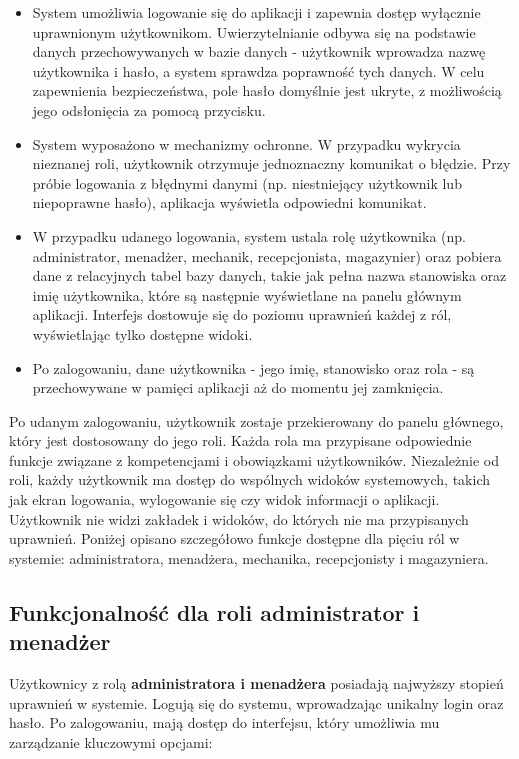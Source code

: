 \begin{itemize}
    \item System umożliwia logowanie się do aplikacji i zapewnia dostęp wyłącznie uprawnionym użytkownikom. Uwierzytelnianie odbywa się na podstawie danych przechowywanych w bazie danych - użytkownik wprowadza nazwę użytkownika i hasło, a system sprawdza poprawność tych danych. W celu zapewnienia bezpieczeństwa, pole hasło domyślnie jest ukryte, z możliwością jego odsłonięcia za pomocą przycisku.
    \item System wyposażono w mechanizmy ochronne. W przypadku wykrycia nieznanej roli, użytkownik otrzymuje jednoznaczny komunikat o błędzie. Przy próbie logowania z błędnymi danymi (np. niestniejący użytkownik lub niepoprawne hasło), aplikacja wyświetla odpowiedni komunikat.
    \item W przypadku udanego logowania, system ustala rolę użytkownika (np. administrator, menadżer, mechanik, recepcjonista, magazynier) oraz pobiera dane z relacyjnych tabel bazy danych, takie jak pełna nazwa stanowiska oraz imię użytkownika, które są następnie wyświetlane na panelu głównym aplikacji. Interfejs dostowuje się do poziomu uprawnień każdej z ról, wyświetlając tylko dostępne widoki.
    \item Po zalogowaniu, dane użytkownika - jego imię, stanowisko oraz rola - są przechowywane w pamięci aplikacji aż do momentu jej zamknięcia.
\end{itemize}
Po udanym zalogowaniu, użytkownik zostaje przekierowany do panelu głównego, który jest dostosowany do jego roli. Każda rola ma przypisane odpowiednie funkcje związane z kompetencjami i obowiązkami użytkowników. Niezależnie od roli, każdy użytkownik ma dostęp do wspólnych widoków systemowych, takich jak ekran logowania, wylogowanie się czy widok informacji o aplikacji. Użytkownik nie widzi zakładek i widoków, do których nie ma przypisanych uprawnień. Poniżej opisano szczegółowo funkcje dostępne dla pięciu ról w systemie: administratora, menadżera, mechanika, recepcjonisty i magazyniera.

\subsection{Funkcjonalność dla roli administrator i menadżer}
\label{sec:funkcjonalnoscAdministratora}
Użytkownicy z rolą \textbf{administratora i menadżera} posiadają najwyższy stopień uprawnień w systemie. Logują się do systemu, wprowadzając unikalny login oraz hasło. Po zalogowaniu, mają dostęp do interfejsu, który umożliwia mu zarządzanie kluczowymi opcjami:

